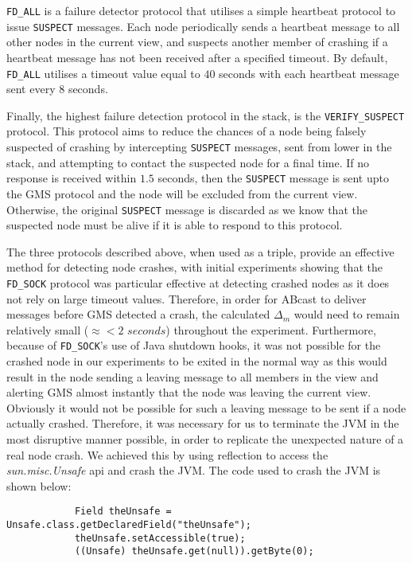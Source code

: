     \texttt{FD\_ALL} is a failure detector protocol that utilises a simple heartbeat protocol \citep{AW98} to issue \texttt{SUSPECT} messages.  Each node periodically sends a heartbeat message to all other nodes in the current view, and suspects another member of crashing if a heartbeat message has not been received after a specified timeout.  By default, \texttt{FD\_ALL} utilises a timeout value equal to $40$ seconds with each heartbeat message sent every $8$ seconds.  
    
    Finally, the highest failure detection protocol in the stack, is the \texttt{VERIFY\_SUSPECT} protocol.  This protocol aims to reduce the chances of a node being falsely suspected of crashing by intercepting \texttt{SUSPECT} messages, sent from lower in the stack, and attempting to contact the suspected node for a final time.  If no response is received within $1.5$ seconds, then the \texttt{SUSPECT} message is sent upto the GMS protocol and the node will be excluded from the current view.  Otherwise, the original \texttt{SUSPECT} message is discarded as we know that the suspected node must be alive if it is able to respond to this protocol.  
    
    The three protocols described above, when used as a triple, provide an effective method for detecting node crashes, with initial experiments showing that the \texttt{FD\_SOCK} protocol was particular effective at detecting crashed nodes as it does not rely on large timeout values.  Therefore, in order for \textsf{ABcast} to deliver messages before GMS detected a crash, the calculated $\Delta_m$ would need to remain relatively small ($\approx < 2$ $seconds$) throughout the experiment.  Furthermore, because of \texttt{FD\_SOCK}'s use of Java shutdown hooks, it was not possible for the crashed node in our experiments to be exited in the normal way as this would result in the node sending a leaving message to all members in the view and alerting GMS almost instantly that the node was leaving the current view.  Obviously it would not be possible for such a leaving message to be sent if a node actually crashed.  Therefore, it was necessary for us to terminate the JVM in the most disruptive manner possible, in order to replicate the unexpected nature of a real node crash.  We achieved this by using reflection to access the \emph{sun.misc.Unsafe} api and crash the JVM.  The code used to crash the JVM is shown below:
    
    \begin{lstlisting}
            Field theUnsafe = Unsafe.class.getDeclaredField("theUnsafe");
            theUnsafe.setAccessible(true);
            ((Unsafe) theUnsafe.get(null)).getByte(0);
    \end{lstlisting}

